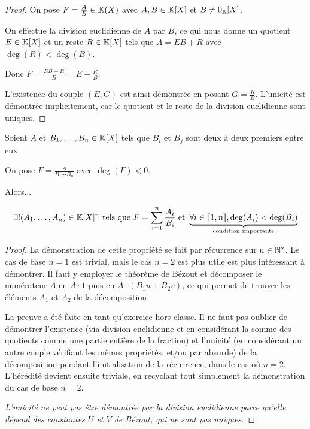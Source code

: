 \documentclass[12pt,a4paper]{report}
\begin{document}
\begin{proof}
    On pose $F = \frac AB \in \mathbb{K}(X)$ avec $A, B \in \mathbb{K}[X]$ et $B \neq 0_{\mathbb{K}}[X]$.

    On effectue la division euclidienne de $A$ par $B$, ce qui nous donne un quotient $E \in \mathbb{K}[X]$ et un reste $R \in \mathbb{K}[X]$ tels que $A = EB + R$ avec $\deg(R) < \deg(B)$.

    Donc $F = \frac{EB + R}{B} = E + \frac RB$.

    L'existence du couple $(E, G)$ est ainsi démontrée en posant $G = \frac RB$. L'unicité est démontrée implicitement, car le quotient et le reste de la division euclidienne sont uniques.
\end{proof}

\begin{property}
    Soient $A$ et $B_1,\dots,B_n \in \mathbb{K}[X]$ tels que $B_i$ et $B_j$ sont deux à deux premiers entre eux.

    On pose $F = \frac{A}{B_1 \cdots B_n}$ avec $\deg(F) < 0$.

    Alors...

    $$\exists! (A_1, \dots, A_n) \in \mathbb{K}[X]^n \text{ tels que } F = \sum_{i=1}^{n}\frac{A_i}{B_i} \text{ et } \underbrace{\forall i \in [\![1,n]\!], \deg(A_i) < \deg(B_i)}_{\text{condition importante}}$$
\end{property}

\begin{proof}
    La démonstration de cette propriété se fait par récurrence sur $n \in \mathbb{N}^*$. Le cas de base $n=1$ est trivial, mais le cas $n=2$ est plus utile est plus intéressant à démontrer. Il faut y employer le théorème de Bézout et décomposer le numérateur $A$ en $A\cdot 1$ puis en $A\cdot (B_1 u + B_2 v)$, ce qui permet de trouver les éléments $A_1$ et $A_2$ de la décomposition.

    La preuve a été faite en tant qu'exercice hors-classe. Il ne faut pas oublier de démontrer l'existence (via division euclidienne et en considérant la somme des quotients comme une partie entière de la fraction) et l'unicité (en considérant un autre couple vérifiant les mêmes propriétés, et/ou par absurde) de la décomposition pendant l'initialisation de la récurrence, dans le cas où $n=2$. L'hérédité devient ensuite triviale, en recyclant tout simplement la démonstration du cas de base $n=2$.

    \textit{L'unicité ne peut pas être démontrée par la division euclidienne parce qu'elle dépend des constantes $U$ et $V$ de Bézout, qui ne sont pas uniques.}
\end{proof}
\end{document}
